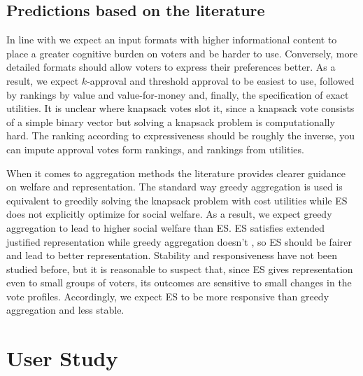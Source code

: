 \documentclass[twoside,11pt]{article}
\newcommand{\mes}{ES}
\begin{document}
\subsection{Predictions based on the literature}


In line with \cite{MPSW19,benade2021preference} we expect an input formats with higher informational content to place a greater cognitive burden on voters and be harder to use. %
Conversely,   more detailed formats should allow voters to express their preferences better. As a result, we expect $k$-approval and threshold approval to be easiest to use, followed by rankings by value and value-for-money and, finally, the specification of exact utilities. It is unclear where knapsack votes slot it, since a knapsack vote consists of a simple binary vector but solving a knapsack problem is computationally hard. The ranking according to expressiveness should be roughly the inverse, you can impute approval votes form rankings, and rankings from utilities. 

When it comes to aggregation methods the literature provides clearer guidance on welfare and representation. The standard way greedy aggregation is used is equivalent to greedily solving the knapsack problem with cost utilities while \mes{} does not  explicitly optimize for social welfare. As a result,  we expect greedy aggregation to lead to higher social welfare than  \mes. \mes{} satisfies extended justified representation while greedy aggregation doesn't \cite{PS20}, so \mes{} should be fairer and lead to better representation. Stability and responsiveness have not been studied before, but it is reasonable to suspect that, since \mes{} gives representation even to small groups of voters, its outcomes are sensitive to small changes in the vote profiles. Accordingly, we expect \mes{} to be more responsive than greedy aggregation and less stable. 
\section{User Study}\label{sec:description}
\end{document}
